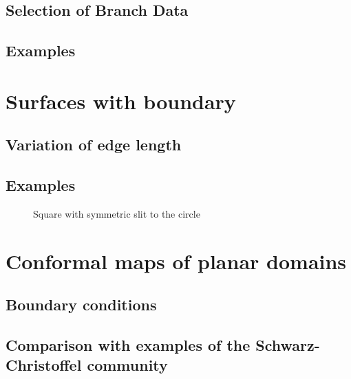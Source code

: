 \documentclass[Thesis.tex]{subfiles}
\begin{document}
\subsection{Selection of Branch Data}
\subsection{Examples}

\section{Surfaces with boundary}
\label{sec:surfaces_with_boundary}
\subsection{Variation of edge length}
\subsection{Examples}
\begin{figure}
\centering
{}
\caption{Square with symmetric slit to the circle}
\label{fig:slit_circle}
\end{figure}


\section{Conformal maps of planar domains}
\label{sec:planar_domains}
\subsection{Boundary conditions}
\subsection{Comparison with examples of the Schwarz-Christoffel community}

\subfilebibliography
\end{document}
